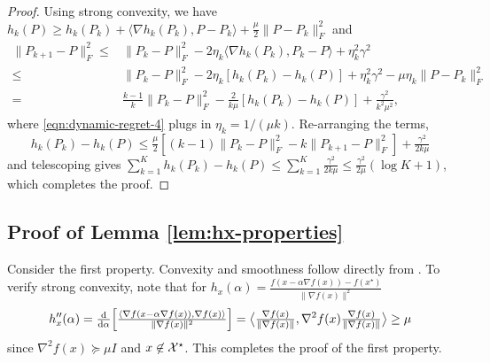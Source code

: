 \begin{proof}

Using strong convexity, we have $h_k (P) \geq h_k (P_k) + \langle \nabla h_k (P_k), P - P_k \rangle +
   \tfrac{\mu}{2} \| P - P_k \|_F^2  $ and 
\begin{align}
  \| P_{k + 1} - P \|_F^2 \leq{} & \| P_k - P \|_F^2 - 2 \eta_k \langle \nabla
  h_k (P_k), P_k - P \rangle + \eta_k^2 \gamma^2 \nonumber\\
  \leq{} & \| P_k - P \|_F^2 - 2 \eta_k [h_k (P_k) - h_k (P)] + \eta_k^2
  \gamma^2 - \mu \eta_k \| P - P_k \|_F^2 \nonumber\\
  ={} & \tfrac{k - 1}{k} \| P_k - P \|_F^2 - \tfrac{2}{k \mu} [h_k (P_k) - h_k
  (P)] + \tfrac{\gamma^2}{k^2 \mu^2} \label{eqn:dynamic-regret-4}, 
\end{align}
where \eqref{eqn:dynamic-regret-4} plugs in $\eta_k = 1/(\mu k)$. Re-arranging the terms, \[h_k (P_k) - h_k (P) \leq \tfrac{\mu}{2} [(k - 1) \|
P_k - P \|_F^2 - k \| P_{k + 1} - P \|_F^2] + \tfrac{\gamma^2}{2 k \mu}\] and
telescoping gives $\sum_{k = 1}^K h_k (P_k) - h_k (P) \leq
\sum_{k = 1}^K \tfrac{\gamma^2}{2 k \mu} \leq \tfrac{\gamma^2}{2 \mu} (\log K
+ 1)$, which completes the proof.
\end{proof}

\subsection{Proof of Lemma \ref{lem:hx-properties}}

Consider the first property. Convexity and smoothness follow directly from \cite{gao2024gradient}.
To verify strong convexity, note that for $h_x (\alpha) = \tfrac{f (x - \alpha
\nabla f (x)) - f (x^{\star})}{\| \nabla f (x) \|^2}$
\[ h_x'' (\alpha) = \tfrac{\mathrm{d}}{\mathrm{d} \alpha} \Big[ \tfrac{\langle \nabla
   f (x - \alpha \nabla f (x)), \nabla f (x) \rangle}{\| \nabla f (x) \|^2}
   \Big] = \big\langle \tfrac{\nabla f (x)}{\| \nabla f (x) \|}, \nabla^2 f
   (x) \tfrac{\nabla f (x)}{\| \nabla f (x) \|} \big\rangle \geq \mu \]
since $\nabla^2 f (x) \succeq \mu I$ and $x \not\in \mathcal{X}^\star$. This completes the proof of the first property.\\


